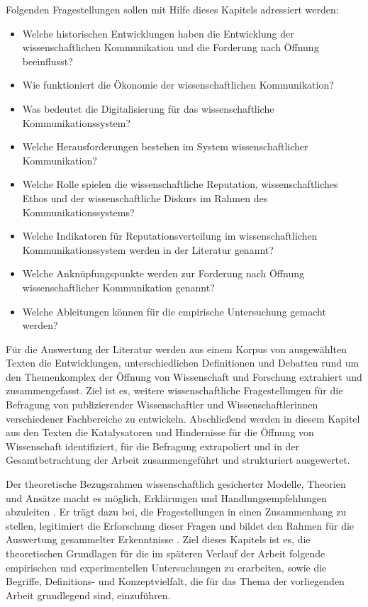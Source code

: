 Folgenden Fragestellungen sollen mit Hilfe dieses Kapitels adressiert werden:
\begin{itemize}
\item Welche historischen Entwicklungen haben die Entwicklung der wissenschaftlichen Kommunikation und die Forderung nach Öffnung beeinflusst?
\item Wie funktioniert die Ökonomie der wissenschaftlichen Kommunikation?
\item Was bedeutet die Digitalisierung für das wissenschaftliche Kommunikationssystem?
\item Welche Herausforderungen bestehen im System wissenschaftlicher Kommunikation?
\item Welche Rolle spielen die wissenschaftliche Reputation, wissenschaftliches Ethos und der wissenschaftliche Diskurs im Rahmen des Kommunikationssystems?
\item Welche Indikatoren für Reputationsverteilung im wissenschaftlichen Kommunikationssystem werden in der Literatur genannt?
\item Welche Anknüpfungspunkte werden zur Forderung nach Öffnung wissenschaftlicher Kommunikation genannt?
\item Welche Ableitungen können für die empirische Untersuchung gemacht werden?
\end{itemize}

Für die Auswertung der Literatur werden aus einem Korpus von ausgewählten Texten die Entwicklungen, unterschiedlichen Definitionen und Debatten rund um den Themenkomplex der Öffnung von Wissenschaft und Forschung extrahiert und zusammengefasst. Ziel ist es, weitere wissenschaftliche Fragestellungen für die Befragung von publizierender Wissenschaftler und Wissenschaftlerinnen verschiedener Fachbereiche zu entwickeln. Abschließend werden in diesem Kapitel aus den Texten die Katalysatoren und Hindernisse für die Öffnung von Wissenschaft identifiziert, für die Befragung extrapoliert und in der Gesamtbetrachtung der Arbeit zusammengeführt und strukturiert ausgewertet.

Der theoretische Bezugsrahmen wissenschaftlich gesicherter Modelle, Theorien und Ansätze macht es möglich, Erklärungen und Handlungsempfehlungen abzuleiten \cite{martin_2007_wissenschaftstheorie}. Er trägt dazu bei, die Fragestellungen in einen Zusammenhang zu stellen, legitimiert die Erforschung dieser Fragen und bildet den Rahmen für die Auswertung gesammelter Erkenntnisse \cite{suchen}. Ziel dieses Kapitels ist es, die theoretischen Grundlagen für die im späteren Verlauf der Arbeit folgende empirischen und experimentellen Untersuchungen zu erarbeiten, sowie die Begriffe,  Definitions- und Konzeptvielfalt, die für das Thema der vorliegenden Arbeit grundlegend sind, einzuführen.


